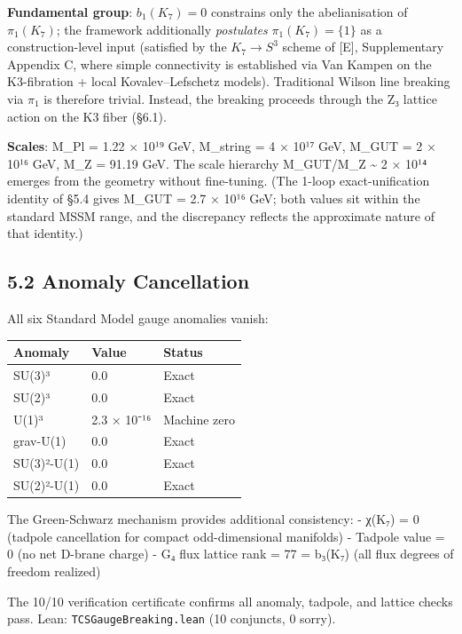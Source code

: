 \documentclass[11pt,a4paper]{article}
\begin{document}
\textbf{Fundamental group}: \(b_1(K_7) = 0\) constrains only the abelianisation of \(\pi_1(K_7)\); the framework additionally \emph{postulates} \(\pi_1(K_7) = \{1\}\) as a construction-level input (satisfied by the \(K_7 \to S^3\) scheme of {[}E{]}, Supplementary Appendix C, where simple connectivity is established via Van Kampen on the K3-fibration + local Kovalev--Lefschetz models). Traditional Wilson line breaking via \(\pi_1\) is therefore trivial. Instead, the breaking proceeds through the Z₃ lattice action on the K3 fiber (§6.1).

\textbf{Scales}: M\_\allowbreak{}Pl = 1.22 × 10¹⁹ GeV, M\_\allowbreak{}string = 4 × 10¹⁷ GeV, M\_\allowbreak{}GUT = 2 × 10¹⁶ GeV, M\_\allowbreak{}Z = 91.19 GeV. The scale hierarchy M\_\allowbreak{}GUT/M\_\allowbreak{}Z \textasciitilde{} 2 × 10¹⁴ emerges from the geometry without fine-tuning. (The 1-loop exact-unification identity of §5.4 gives M\_\allowbreak{}GUT = 2.7 × 10¹⁶ GeV; both values sit within the standard MSSM range, and the discrepancy reflects the approximate nature of that identity.)

\subsection{5.2 Anomaly Cancellation}\label{anomaly-cancellation}

All six Standard Model gauge anomalies vanish:

\begin{longtable}[]{@{}lll@{}}
\toprule\noalign{}
Anomaly & Value & Status \\
\midrule\noalign{}
\endhead
\bottomrule\noalign{}
\endlastfoot
SU(3)³ & 0.0 & Exact \\
SU(2)³ & 0.0 & Exact \\
U(1)³ & 2.3 × 10⁻¹⁶ & Machine zero \\
grav-U(1) & 0.0 & Exact \\
SU(3)²-U(1) & 0.0 & Exact \\
SU(2)²-U(1) & 0.0 & Exact \\
\end{longtable}

The Green-Schwarz mechanism provides additional consistency: - χ(K₇) = 0 (tadpole cancellation for compact odd-dimensional manifolds) - Tadpole value = 0 (no net D-brane charge) - G₄ flux lattice rank = 77 = b₃(K₇) (all flux degrees of freedom realized)

The 10/10 verification certificate confirms all anomaly, tadpole, and lattice checks pass. Lean: \texttt{TCSGauge\allowbreak{}Breaking.\allowbreak{}lean} (10 conjuncts, 0 sorry).
\end{document}
